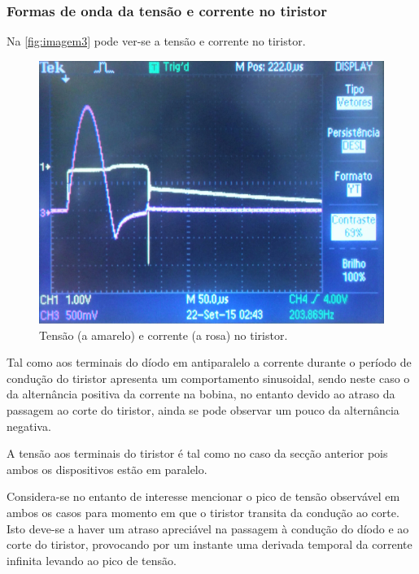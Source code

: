 \documentclass[a4paper,11pt]{article}
\numberwithin{equation}{section}
\begin{document}
\subsubsection{Formas de onda da tensão e corrente no tiristor}

Na \autoref{fig:imagem3} pode ver-se a tensão e corrente no tiristor.

\begin{figure}[h]
	\centering
	\includegraphics[keepaspectratio=true, scale=0.165]{img/imagem3}
	\caption{Tensão (a amarelo) e corrente (a rosa) no tiristor.}
	\label{fig:imagem3}
	\vspace{-0.8em}
\end{figure}


Tal como aos terminais do díodo em antiparalelo a corrente durante o período de condução do tiristor apresenta um comportamento sinusoidal, sendo neste caso o da alternância positiva da corrente na bobina, no entanto devido ao atraso da passagem ao corte do tiristor, ainda se pode observar um pouco da alternância negativa.

A tensão aos terminais do tiristor é tal como no caso da secção anterior pois ambos os dispositivos estão em paralelo.

Considera-se no entanto de interesse mencionar o pico de tensão observável em ambos os casos para momento em que o tiristor transita da condução ao corte. Isto deve-se a haver um atraso apreciável na passagem à condução do díodo e ao corte do tiristor, provocando por um instante uma derivada temporal da corrente infinita levando ao pico de tensão.
\end{document}
